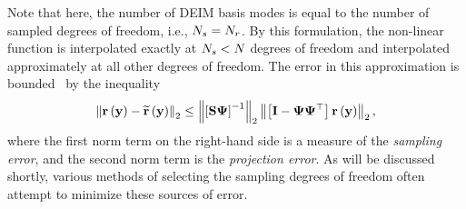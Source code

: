 Note that here, the number of DEIM basis modes is equal to the number of sampled degrees of freedom, i.e., $N_s = N_r$. By this formulation, the non-linear function is interpolated exactly at $N_s < N$ degrees of freedom and interpolated approximately at all other degrees of freedom. The error in this approximation is bounded~\cite{Chaturantabut2010} by the inequality
%
\begin{equation}\label{eq:deimErrorBound}
   \left\Vert \resFunc{\dummyVec} - \resApproxFunc{\dummyVec} \right\Vert_2 \le \left\Vert \left[ \sampMat \deimBasis \right]^{-1} \right\Vert_2 \left\Vert \left[ \identMat - \deimBasis \deimBasis^\top \right] \resFunc{\dummyVec} \right\Vert_2,
\end{equation}
%
where the first norm term on the right-hand side is a measure of the \textit{sampling error}, and the second norm term is the \textit{projection error}. As will be discussed shortly, various methods of selecting the sampling degrees of freedom often attempt to minimize these sources of error.

